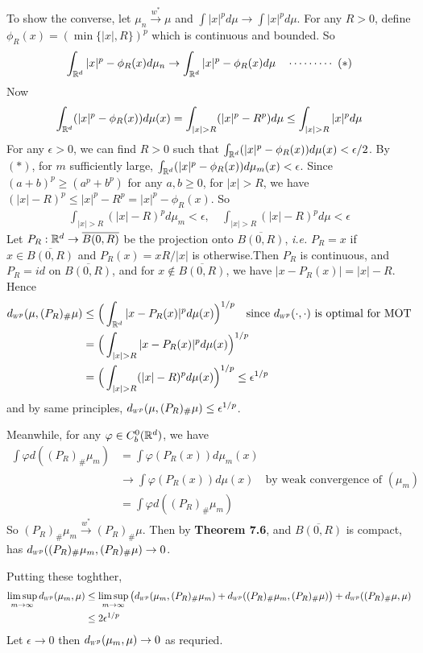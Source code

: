 \documentclass[12pt,a4paper]{article}
\newenvironment{proof}
{\begin{changemargin}{1cm}{0.5cm} 
	}%
	{\end{changemargin}
}
\newenvironment{p}
{\begin{proof} 
	}%
	{\end{proof}
}
\begin{document}
\begin{p}
To show the converse, let $\mu_n \xrightarrow{w^*} \mu$ and $\int |x|^p d\mu \rightarrow \int |x|^p d\mu$. For any $R>0$, define $\phi_R(x) = (\min \{|x|,R\})^p$ which is continuous and bounded. So
\begin{align*}
\int_{\mathbb{R}^d} |x|^p - \phi_R(x) d\mu_n \rightarrow \int_{\mathbb{R}^d}|x|^p - \phi_R(x) d\mu \quad \cdots\cdots\cdots\,\,(*)
\end{align*}
Now
\begin{align*}
\int_{\reals^d} (|x|^p - \phi_R(x)) d\mu(x) = \int_{|x|>R} (|x|^p -R^p) d\mu \leq \int_{|x|>R} |x|^p d\mu
\end{align*}
For any $\epsilon >0$, we can find $R>0$ such that $\int_{\mathbb{R}^d} (|x|^p -\phi_R(x)) d\mu(x) < \epsilon /2$. By $(*)$, for $m$ sufficiently large, $\int_{\mathbb{R}^d} (|x|^p - \phi_R(x)) d\mu_m(x) < \epsilon$. Since $(a+b)^p \geq (a^p + b^p)$ for any $a,b\geq 0$, for $|x|>R$, we have $(|x| - R)^p \leq |x|^p - R^p = |x|^p - \phi_R(x)$. So
\begin{align*}
\int_{|x|>R} (|x| - R)^p d\mu_m < \epsilon, \quad \int_{|x|>R} (|x| - R)^p d\mu < \epsilon 
\end{align*}
Let $P_R : \mathbb{R}^d \rightarrow \overline{B(0, R)}$ be the projection onto $\overline{B(0, R)}$, \textit{i.e.} $P_{R} =x$ if $x\in \overline{B(0, R)}$ and $P_R(x) = xR / |x|$ is otherwise.Then $P_R$ is continuous, and $P_R =id$ on $\overline{B(0, R)}$, and for $x\not\in \overline{B(0, R)}$, we have $|x- P_R(x)| = |x| - R$. Hence
\begin{align*}
\wa{p}(\mu, (P_R)_{\#}\mu) &\leq \Big( \int_{\reals^d} |x- P_R(x)|^p d\mu(x) \Big)^{1/p} \quad \text{since } \wa{p}(\cdot, \cdot) \text{ is optimal for MOT} \\
&= \Big( \int_{|x|>R} |x- P_R(x)|^p d\mu(x) \Big)^{1/p} \\
&= \Big( \int_{|x|>R} (|x|- R)^p d\mu(x) \Big)^{1/p} \leq \epsilon^{1/p} 
\end{align*}
and by same principles, $\wa{p}(\mu, (P_R)_{\#}\mu) \leq \epsilon^{1/p}$.

\quad Meanwhile, for any $\varphi \in C_b^0 (\mathbb{R}^d)$, we have
\begin{align*}
\int \varphi d( (P_R)_{\#} \mu_m) & = \int \varphi (P_R(x)) d\mu_m(x) \\
& \rightarrow \int \varphi(P_R(x)) d\mu(x) \quad \text{by weak convergence of } (\mu_m) \\
& =\int \varphi d( (P_R)_{\#} \mu_m)
\end{align*} 
So $(P_R)_{\#} \mu_m \xrightarrow{w^*} (P_R)_{\#} \mu$. Then by \textbf{Theorem 7.6}, and $\overline{B(0, R)}$ is compact, has $\wa{p}((P_R)_{\#}\mu_m, (P_R)_{\#}\mu) \rightarrow 0$.

\quad Putting these toghther,
\begin{align*}
\limsup_{m\rightarrow \infty} \wa{p}(\mu_m, \mu) & \leq \limsup_{m\rightarrow \infty} \big( \wa{p}(\mu_m, (P_R)_{\#}\mu_m) + \wa{p}((P_R)_{\#}\mu_m, (P_R)_{\#}\mu) \big) + \wa{p}((P_R)_{\#}\mu, \mu) \\
& \leq 2\epsilon^{1/p}
\end{align*}
Let $\epsilon \rightarrow 0$ then $\wa{p}(\mu_m, \mu) \rightarrow 0$ as requried.

\eop
\end{p}
\end{document}
